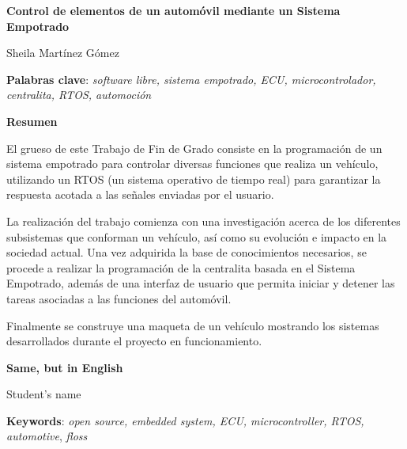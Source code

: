 \thispagestyle{empty}

\begin{center}
{\large\bfseries Control de elementos de un automóvil \newline mediante un Sistema Empotrado }\newline
\end{center}
\begin{center}
Sheila Martínez Gómez\newline
\end{center}


\vspace{0.5cm}
\noindent\textbf{Palabras clave}: \textit{software libre, sistema empotrado, ECU, microcontrolador, centralita, RTOS, automoción}
\vspace{0.7cm}

\noindent\textbf{Resumen}\newline

El grueso de este Trabajo de Fin de Grado consiste en la programación de un sistema empotrado para controlar diversas funciones que realiza un vehículo, utilizando un RTOS (un sistema operativo de tiempo real) para garantizar la respuesta acotada a las señales enviadas por el usuario.\newline

La realización del trabajo comienza con una investigación acerca de los diferentes subsistemas que conforman un vehículo, así como su evolución e impacto en la sociedad actual. Una vez adquirida la base de conocimientos necesarios, se procede a realizar la programación de la centralita basada en el Sistema Empotrado, además de una interfaz de usuario que permita iniciar y detener las tareas asociadas a las funciones del automóvil.\newline

Finalmente se construye una maqueta de un vehículo mostrando los sistemas desarrollados durante el proyecto en funcionamiento.\newline

\cleardoublepage

\begin{center}
	{\large\bfseries Same, but in English}\\
\end{center}
\begin{center}
	Student's name\\
\end{center}
\vspace{0.5cm}
\noindent\textbf{Keywords}: \textit{open source, embedded system, ECU, microcontroller, RTOS, automotive}, \textit{floss}
\vspace{0.7cm}

